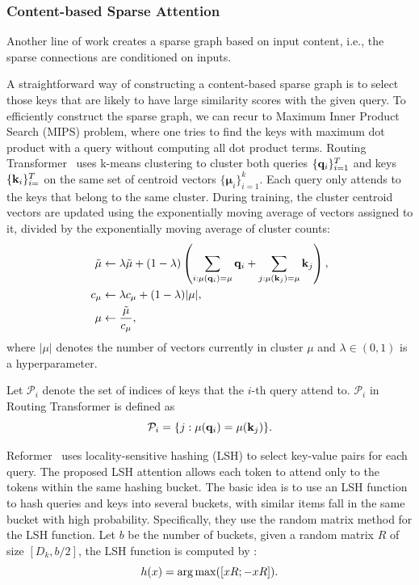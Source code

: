 \documentclass[manuscript,acmsmall,screen,nonacm]{acmart}
\theoremstyle{definition}
\begin{document}
\subsubsection{Content-based Sparse Attention}
Another line of work creates a sparse graph based on input content, i.e., the sparse connections are conditioned on inputs.

A straightforward way of constructing a content-based sparse graph is to select those keys that are likely to have large similarity scores with the given query. To efficiently construct the sparse graph, we can recur to Maximum Inner Product Search (MIPS) problem, where one tries to find the keys with maximum dot product with a query without computing all dot product terms. Routing Transformer~\cite{roy2020efficient} uses k-means clustering to cluster both queries $\{\mathbf{q}_i\}_{i=1}^T$ and keys $\{\mathbf{k}_i\}_{i=}^T$  on the same set of centroid vectors $\{\mathbf\mu_i\}_{i=1}^k$. Each query only attends to the keys that belong to the same cluster.
During training, the cluster centroid vectors are updated using the exponentially moving average of vectors assigned to it, divided by the exponentially moving average of cluster counts:
\begin{align}
\tilde\mu&\leftarrow \lambda\tilde\mu+(1-\lambda)\left(\sum_{i:\mu(\mathbf{q}_i)=\mu}\mathbf{q}_i+\sum_{j:\mu(\mathbf{k}_j)=\mu}\mathbf{k}_j\right),\\
c_\mu&\leftarrow \lambda c_\mu+(1-\lambda)|\mu|,\\
\mu&\leftarrow \frac{\tilde\mu}{c_\mu},
\end{align}
where $|\mu|$ denotes the number of vectors currently in cluster $\mu$ and $\lambda\in(0,1)$ is a hyperparameter.

Let $\mathcal{P}_i$ denote the set of indices of keys that the $i$-th query attend to. $\mathcal{P}_i$ in Routing Transformer is defined as
\begin{equation}
    \mathcal{P}_i=\{j: \mu(\mathbf{q}_i)=\mu(\mathbf{k}_j) \}.
\end{equation}

Reformer~\cite{kitaev2020reformer} uses locality-sensitive hashing (LSH) to select key-value pairs for each query. The proposed LSH attention allows each token to attend only to the tokens within the same hashing bucket. The basic idea is to use an LSH function to hash queries and keys into several buckets, with similar items fall in the same bucket with high probability. Specifically, they use the random matrix method for the LSH function. Let $b$ be the number of buckets, given a random matrix $R$ of size $[D_k,b/2]$, the LSH function is computed by :
\begin{equation}
    h(x)=\operatorname*{arg\,max}([xR;-xR]).
\end{equation}
\end{document}
